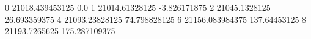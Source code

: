 0 21018.439453125 0.0
1 21014.61328125 -3.826171875
2 21045.1328125 26.693359375
4 21093.23828125 74.798828125
6 21156.083984375 137.64453125
8 21193.7265625 175.287109375
